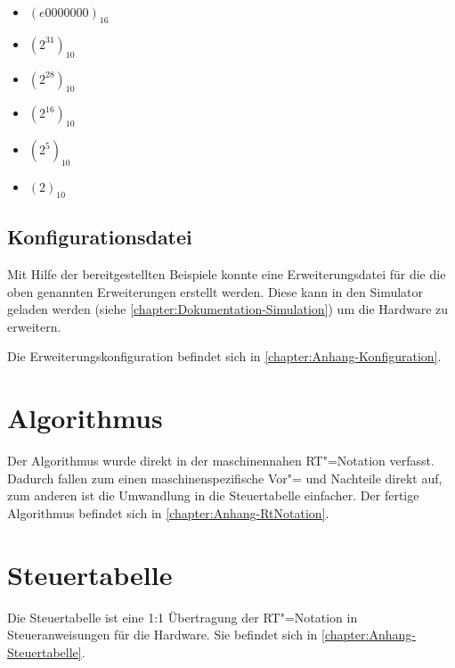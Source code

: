 \begin{itemize}
    \item $(e0000000)_{16}$
    \item $(2^{31})_{10}$
    \item $(2^{28})_{10}$
    \item $(2^{16})_{10}$
    \item $(2^5)_{10}$
    \item $(2)_{10}$
\end{itemize}

\subsection{Konfigurationsdatei}
\label{subsection:Dokumentation-Implementierung-Hardwareerweiterung-Konfigurationsdatei}

Mit Hilfe der bereitgestellten Beispiele konnte eine Erweiterungsdatei für die die oben genannten Erweiterungen erstellt werden. Diese kann in den Simulator geladen werden (siehe \autoref{chapter:Dokumentation-Simulation}) um die Hardware zu erweitern.

Die Erweiterungskonfiguration befindet sich in \autoref{chapter:Anhang-Konfiguration}.

\section{Algorithmus}
\label{section:Dokumentation-Implementierung-Algorithmus}

Der Algorithmus wurde direkt in der maschinennahen RT"=Notation verfasst. Dadurch fallen zum einen maschinenspezifische Vor"= und Nachteile direkt auf, zum anderen ist die Umwandlung in die Steuertabelle einfacher. Der fertige Algorithmus befindet sich in \autoref{chapter:Anhang-RtNotation}.

\section{Steuertabelle}
\label{section:Dokumentation-Implementierung-Steuertabelle}

Die Steuertabelle ist eine 1:1 Übertragung der RT"=Notation in Steueranweisungen für die Hardware. Sie befindet sich in \autoref{chapter:Anhang-Steuertabelle}.
